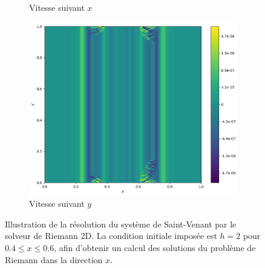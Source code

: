 \documentclass[
	french,
	11pt, %
]{fphw}
\begin{document}
\begin{figure}[H]
\begin{subfigure}{0.32\textwidth}
		\caption{Vitesse suivant $x$}
		\label{fig:Riem1u}
	\end{subfigure}
	\begin{subfigure}{0.32\textwidth}
		\centering
		\includegraphics[width=\textwidth,height=0.85\textwidth]{Riem1v.png}
		\caption{Vitesse suivant $y$}
		\label{fig:Riem1v}
	\end{subfigure}
	\caption{Illustration de la résolution du système de Saint-Venant par le solveur de Riemann 2D. La condition initiale imposée est  $ h = 2$ pour $ 0.4 \leq x \leq 0.6$, afin d'obtenir un calcul des solutions du problème de Riemann dans la direction $x$.}
	\label{fig:Riem1}
\end{figure}
\end{document}
